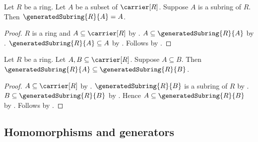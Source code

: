 \begin{corollary}\label{generated_subring_of_subring}
    Let $R$ be a ring.
    Let $A$ be a subset of $\carrier[R]$.
    Suppose $A$ is a subring of $R$.
    Then $\generatedSubring{R}{A}=A$.
\end{corollary}
\begin{proof}
    $R$ is a ring and $A\subseteq\carrier[R]$ by
        .
    $A\subseteq\generatedSubring{R}{A}$ by
        .
    $\generatedSubring{R}{A}\subseteq A$ by
        .
    Follows by .
\end{proof}

\begin{proposition}\label{generated_subring_monotone}
    Let $R$ be a ring.
    Let $A,B\subseteq\carrier[R]$.
    Suppose $A\subseteq B$.
    Then $\generatedSubring{R}{A}\subseteq\generatedSubring{R}{B}$.
\end{proposition}
\begin{proof}
    $A\subseteq\carrier[R]$ by .
    $\generatedSubring{R}{B}$ is a subring of $R$ by
        .
    $B\subseteq\generatedSubring{R}{B}$ by
        .
    Hence $A\subseteq\generatedSubring{R}{B}$ by
        .
    Follows by .
\end{proof}

\subsection{Homomorphisms and generators}

